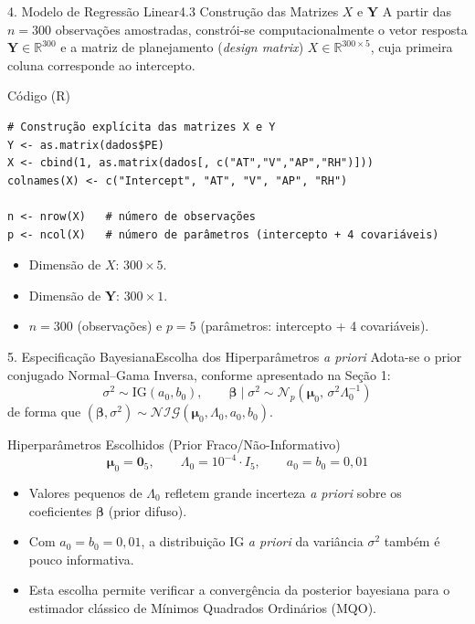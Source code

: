 \documentclass[10pt,aspectratio=169]{beamer}
\begin{document}
\begin{frame}[fragile]{4. Modelo de Regressão Linear}{4.3 Construção das Matrizes $X$ e $\mathbf{Y}$}
    A partir das $n = 300$ observações amostradas, constrói-se computacionalmente o vetor resposta $\mathbf{Y} \in \mathbb{R}^{300}$ e a matriz de planejamento (\textit{design matrix}) $X \in \mathbb{R}^{300 \times 5}$, cuja primeira coluna corresponde ao intercepto.
    \begin{block}{Código (R)}
\begin{verbatim}
# Construção explícita das matrizes X e Y
Y <- as.matrix(dados$PE)
X <- cbind(1, as.matrix(dados[, c("AT","V","AP","RH")]))
colnames(X) <- c("Intercept", "AT", "V", "AP", "RH")

n <- nrow(X)   # número de observações
p <- ncol(X)   # número de parâmetros (intercepto + 4 covariáveis)
\end{verbatim}
    \end{block}
    \begin{itemize}
        \item Dimensão de $X$: $300 \times 5$.
        \item Dimensão de $\mathbf{Y}$: $300 \times 1$.
        \item $n = 300$ (observações) e $p = 5$ (parâmetros: intercepto + 4 covariáveis).
    \end{itemize}
\end{frame}

\begin{frame}{5. Especificação Bayesiana}{Escolha dos Hiperparâmetros \textit{a priori}}
    Adota-se o prior conjugado Normal--Gama Inversa, conforme apresentado na Seção 1:
    $$\sigma^2 \sim \text{IG}(a_0, b_0), \qquad \boldsymbol{\beta} \mid \sigma^2 \sim \mathcal{N}_p\left(\boldsymbol{\mu}_0,\, \sigma^2 \Lambda_0^{-1}\right)$$
    de forma que $(\boldsymbol{\beta}, \sigma^2) \sim \mathcal{NIG}(\boldsymbol{\mu}_0, \Lambda_0, a_0, b_0)$.
    \begin{block}{Hiperparâmetros Escolhidos (Prior Fraco/Não-Informativo)}
        $$\boldsymbol{\mu}_0 = \mathbf{0}_5, \qquad \Lambda_0 = 10^{-4} \cdot I_5, \qquad a_0 = b_0 = 0,01$$
    \end{block}
    \begin{itemize}
        \item Valores pequenos de $\Lambda_0$ refletem grande incerteza \textit{a priori} sobre os coeficientes $\boldsymbol{\beta}$ (prior difuso).
        \item Com $a_0 = b_0 = 0,01$, a distribuição IG \textit{a priori} da variância $\sigma^2$ também é pouco informativa.
        \item Esta escolha permite verificar a convergência da posterior bayesiana para o estimador clássico de Mínimos Quadrados Ordinários (MQO).
    \end{itemize}
\end{frame}
\end{document}
